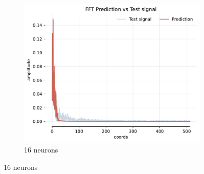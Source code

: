 \begin{figure}[h]
    \begin{subfigure}[b]{0.32\textwidth}
        \centering
        \includegraphics[width=\textwidth]{img/ch3/fft-1hl-16hf-2hz.pdf}
        \caption{16 neurons}
        \label{fig:fft-1hl-16hf-2hz}
    \end{subfigure}


\end{figure}
